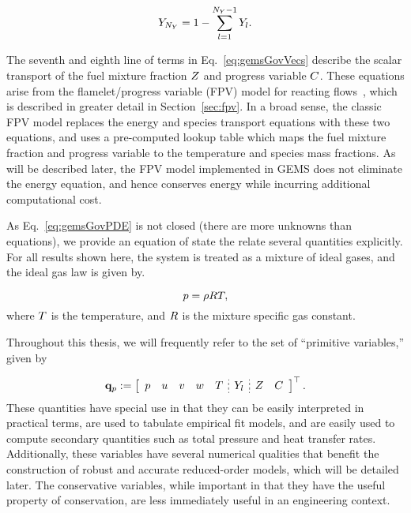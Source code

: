 \begin{equation}
	Y_{N_Y} = 1 - \sum_{l = 1}^{N_Y-1} Y_{l}.
\end{equation}

The seventh and eighth line of terms in Eq.~\ref{eq:gemsGovVecs} describe the scalar transport of the fuel mixture fraction $Z$ and progress variable $C$. These equations arise from the flamelet/progress variable (FPV) model for reacting flows~\cite{Pierce2001}, which is described in greater detail in Section~\ref{sec:fpv}. In a broad sense, the classic FPV model replaces the energy and species transport equations with these two equations, and uses a pre-computed lookup table which maps the fuel mixture fraction and progress variable to the temperature and species mass fractions. As will be described later, the FPV model implemented in GEMS does not eliminate the energy equation, and hence conserves energy while incurring additional computational cost.

As Eq.~\ref{eq:gemsGovPDE} is not closed (there are more unknowns than equations), we provide an equation of state the relate several quantities explicitly. For all results shown here, the system is treated as a mixture of ideal gases, and the ideal gas law is given by.

\begin{equation}\label{eq:idealGas}
	p = \rho R T,
\end{equation}
where $T$ is the temperature, and $R$ is the mixture specific gas constant.

Throughout this thesis, we will frequently refer to the set of ``primitive variables,'' given by

\begin{equation}\label{eq:gemsPrimVec}
    \primVec \defEq \left[
    \begin{array}{ccccc;{2pt/2pt}c;{2pt/2pt}cc}
    \pressure & \velX & \velY & \velZ & \temperature & \mfSpec & \mixFrac & \progVar
    \end{array}
    \right]^\top.
\end{equation}
These quantities have special use in that they can be easily interpreted in practical terms, are used to tabulate empirical fit models, and are easily used to compute secondary quantities such as total pressure and heat transfer rates. Additionally, these variables have several numerical qualities that benefit the construction of robust and accurate reduced-order models, which will be detailed later. The conservative variables, while important in that they have the useful property of conservation, are less immediately useful in an engineering context.

